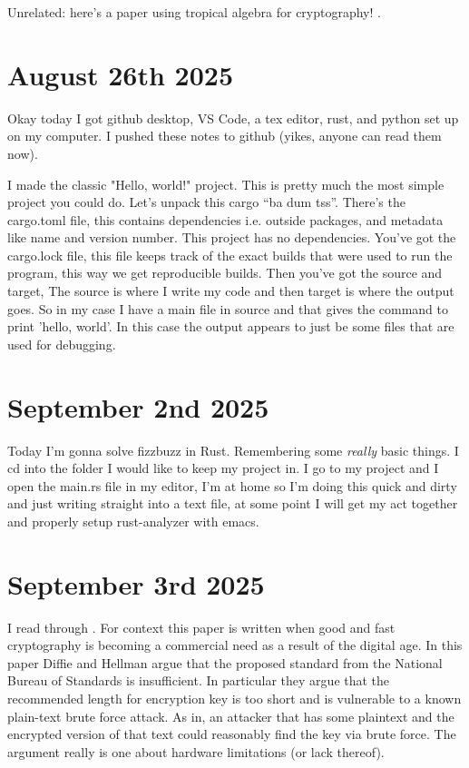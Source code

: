 \documentclass{amsart}
\theoremstyle{definition}
\begin{document}
Unrelated: here's a paper using tropical algebra for cryptography! \cite{TropCrypt}.


\section{August 26th 2025}

Okay today I got github desktop, VS Code, a tex editor, rust, and python set up on my computer. I pushed these notes to github (yikes, anyone can read them now).

I made the classic "Hello, world!" project. This is pretty much the most simple project you could do. Let's unpack this cargo ``ba dum tss''. There's the cargo.toml file, this contains dependencies i.e. outside packages, and metadata like name and version number. This project has no dependencies. You've got the cargo.lock file, this file keeps track of the exact builds that were used to run the program, this way we get reproducible builds. Then you've got the source and target, The source is where I write my code and then target is where the output goes. So in my case I have a main file in source and that gives the command to print 'hello, world'. In this case the output appears to just be some files that are used for debugging.

\section{September 2nd 2025}

Today I'm gonna solve fizzbuzz in Rust. Remembering some \textit{really} basic things. I cd into the folder I would like to keep my project in. I go to my project and I open the main.rs file in my editor, I'm at home so I'm doing this quick and dirty and just writing straight into a text file, at some point I will get my act together and properly setup rust-analyzer with emacs.


\section{September 3rd 2025}

I read through \cite{Cryptanalysis}. For context this paper is written when good and fast cryptography is becoming a commercial need as a result of the digital age. In this paper Diffie and Hellman argue that the proposed standard from the National Bureau of Standards is insufficient. In particular they argue that the recommended length for encryption key is too short and is vulnerable to a known plain-text brute force attack. As in, an attacker that has some plaintext and the encrypted version of that text could reasonably find the key via brute force. The argument really is one about hardware limitations (or lack thereof). 
\end{document}
